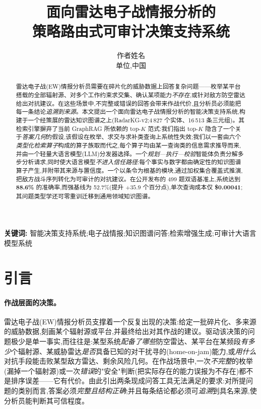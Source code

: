 \documentclass[11pt,a4paper]{article}
\title{\bfseries 面向雷达电子战情报分析的\\策略路由式可审计决策支持系统}
\author{作者姓名\\ \small 单位,中国}
\date{}
\begin{document}
\maketitle

\begin{abstract}
\noindent
雷达电子战(EW)情报分析员需要在碎片化的威胁数据上回答复杂问题——枚举某平台搭载的全部辐射源、对多个工作约束求交集、确认某项能力\emph{不存在},或针对敌方防空雷达给出对抗建议。在这些场景中,不完整或错误的回答会带来作战代价,且分析员必须能把每一条结论\emph{追溯到来源}。本文提出一个面向雷达电子战情报分析的智能决策支持系统,构建于一个经策展的雷达知识图谱之上(RadarKG-v2;4\,827 个实体、16\,513 条三元组)。其检索引擎摒弃了当前 GraphRAG 所依赖的 top-$K$ 范式:我们指出 top-$K$ 隐含了一个关于\emph{答案几何}的假设,该假设在枚举、求交与求补类查询上系统性失效;我们以一套由六个\emph{类型化检索算子}构成的算子族取而代之,每个算子均由某一查询类的信息需求推导而来,并由一个轻量大语言模型(LLM)分发器选择。一个\emph{规划—执行—校验}智能体负责分解多步分析请求,同时使大语言模型\emph{不进入信任路径}:每个事实与数字都由确定性的知识图谱算子产生,并附带其来源与置信度。一个以条令为根基的模块,通过加权集合覆盖式推演,把敌方战斗序列转化为可审计的对抗建议。在公开发布的 499 题双语基准上,系统达到 \textbf{88.6\%} 的准确率,而强基线为 52.7\%(提升 $+35.9$ 个百分点),单次查询成本仅 \textbf{\$0.00041};其问题类型学还可零重训迁移到通用领域知识图谱。
\end{abstract}

\noindent\textbf{关键词:} 智能决策支持系统;电子战情报;知识图谱问答;检索增强生成;可审计大语言模型系统

\section{引言}
\label{sec:intro}

\paragraph{作战层面的决策。}
雷达电子战(EW)情报分析员支撑着一个反复出现的决策:给定一批碎片化、多来源的威胁数据,刻画某个辐射源或平台,并最终给出对其作战的建议。驱动该决策的问题极少是单一事实,而往往是:某型系统\emph{配备了哪些}防空雷达、某平台在某频段\emph{有多少}个辐射源、某威胁雷达\emph{是否}具备已知的对干扰寻的(home-on-jam)能力,或\emph{用什么}对抗手段能击败某型敌方雷达、剩余风险几何。在作战场景中,一次\emph{不完整}的枚举(漏掉一个辐射源)或一次\emph{错误}的"安全"判断(把实际存在的能力误报为不存在)都不是排序误差——它有代价。由此引出两条现成问答工具无法满足的要求:对所提问题的类别而言,答案必须\emph{完整且结构正确};并且每条结论都必须可\emph{追溯}到具名来源,使分析员能判断其可信程度。
\end{document}
